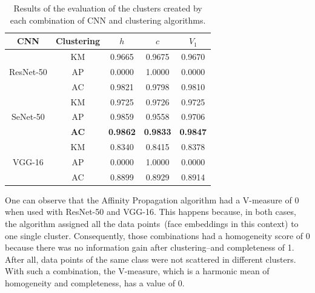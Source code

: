 \begin{table}[!ht]
\centering
\small
\caption{Results of the evaluation of the clusters created by each combination of CNN and clustering algorithms.}
\begin{tabular}{@{}ccccc@{}}
\toprule
\textbf{CNN} & \textbf{Clustering} & \textbf{$h$} & \textbf{$c$} & \textbf{$V_1$} \\ \midrule
                  & KM                  & 0.9665                     & 0.9675                      & 0.9670             \\
ResNet-50         & AP                  & 0.0000                     & 1.0000                      & 0.0000             \\
                  & AC                  & 0.9821                     & 0.9798                      & 0.9810             \\ \midrule
                  & KM                  & 0.9725                     & 0.9726                      & 0.9725             \\
SeNet-50          & AP                  & 0.9859                     & 0.9558                      & 0.9706             \\
                  & \textbf{AC}         & \textbf{0.9862}            & \textbf{0.9833}             & \textbf{0.9847}    \\ \midrule
                  & KM                  & 0.8340                     & 0.8415                      & 0.8378             \\
VGG-16            & AP                  & 0.0000                     & 1.0000                      & 0.0000             \\
                  & AC                  & 0.8899                     & 0.8929                      & 0.8914             \\
\end{tabular}
\label{tab:results_clustering}
\end{table}

One can observe that the Affinity Propagation algorithm had a V-measure of $0$ when used with ResNet-50 and VGG-16. 
This happens because, in both cases, the algorithm assigned all the data points~(face embeddings in this context) to one single cluster. 
Consequently, those combinations had a homogeneity score of $0$ because there was no information gain after clustering--and completeness of 1. After all, data points of the same class were not scattered in different clusters.
With such a combination, the V-measure, which is a harmonic mean of homogeneity and completeness, has a value of $0$.



